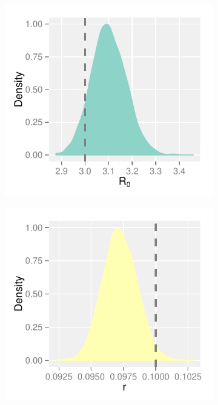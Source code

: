 \documentclass[12pt]{article}
\begin{document}
    \begin{figure}[H]
    \centering
        \begin{subfigure}[tl]{0.49\textwidth}
            \includegraphics[width=\textwidth]{./images/kernelR0.pdf}
        \end{subfigure}
        \begin{subfigure}[tr]{0.49\textwidth}
            \includegraphics[width=\textwidth]{./images/kernelr.pdf}

\end{subfigure}
\end{figure}
\end{document}
